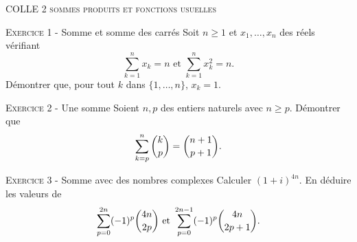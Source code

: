 

\newcommand{\mtn}{\mathbb{N}}
\newcommand{\mtns}{\mathbb{N}^*}
\newcommand{\mtz}{\mathbb{Z}}
\newcommand{\mtr}{\mathbb{R}}
\newcommand{\mtk}{\mathbb{K}}
\newcommand{\mtq}{\mathbb{Q}}
\newcommand{\mtc}{\mathbb{C}}
\newcommand{\mch}{\mathcal{H}}
\newcommand{\mcp}{\mathcal{P}}
\newcommand{\mcb}{\mathcal{B}}
\newcommand{\mcl}{\mathcal{L}}
\newcommand{\mcm}{\mathcal{M}}
\newcommand{\mcc}{\mathcal{C}}
\newcommand{\mcmn}{\mathcal{M}}
\newcommand{\mcmnr}{\mathcal{M}_n(\mtr)}
\newcommand{\mcmnk}{\mathcal{M}_n(\mtk)}
\newcommand{\mcsn}{\mathcal{S}_n}
\newcommand{\mcs}{\mathcal{S}}
\newcommand{\mcd}{\mathcal{D}}
\newcommand{\mcsns}{\mathcal{S}_n^{++}}
\newcommand{\glnk}{GL_n(\mtk)}
\newcommand{\mnr}{\mathcal{M}_n(\mtr)}
\DeclareMathOperator{\ch}{ch}
\DeclareMathOperator{\sh}{sh}
\DeclareMathOperator{\vect}{vect}
\DeclareMathOperator{\card}{card}
\DeclareMathOperator{\comat}{comat}
\DeclareMathOperator{\imv}{Im}
\DeclareMathOperator{\rang}{rg}
\DeclareMathOperator{\Fr}{Fr}
\DeclareMathOperator{\diam}{diam}
\DeclareMathOperator{\supp}{supp}
\newcommand{\veps}{\varepsilon}
\newcommand{\mcu}{\mathcal{U}}
\newcommand{\mcun}{\mcu_n}
\newcommand{\dis}{\displaystyle}
\newcommand{\croouv}{[\![}
\newcommand{\crofer}{]\!]}
\newcommand{\rab}{\mathcal{R}(a,b)}
\newcommand{\pss}[2]{\langle #1,#2\rangle}

 

\begin{center}\textsc{{\huge COLLE 2 sommes produits et fonctions usuelles}}\end{center}



\vskip0.3cm\noindent\textsc{Exercice 1} - Somme et somme des carrés
\vskip0.2cm
Soit $n\geq 1$ et $x_1,\dots,x_n$ des réels vérifiant 
$$\sum_{k=1}^n x_k=n\textrm{ et }\sum_{k=1}^n x_k^2=n.$$
Démontrer que, pour tout $k$ dans $\{1,\dots,n\}$, $x_k=1$.




\vskip0.3cm\noindent\textsc{Exercice 2} - Une somme
\vskip0.2cm
Soient $n,p$ des entiers naturels avec $n\geq p$. Démontrer que
$$\sum_{k=p}^n \dbinom{k}{p}=\dbinom{n+1}{p+1}.$$




\vskip0.3cm\noindent\textsc{Exercice 3} - Somme avec des nombres complexes
\vskip0.2cm
Calculer $(1+i)^{4n}$. En déduire les valeurs de 
$$\sum_{p=0}^{2n}(-1)^p \dbinom{4n}{2p}\textrm{ et }\sum_{p=0}^{2n-1}(-1)^p \dbinom{4n}{2p+1}.$$


